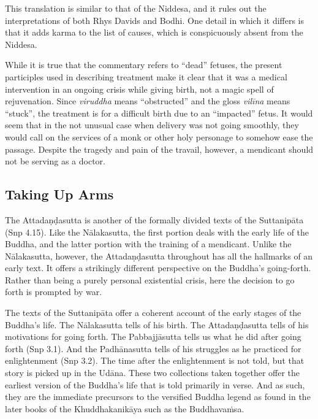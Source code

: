 \documentclass[12pt,openany]{book}%
\begin{document}
This translation is similar to that of the Niddesa, and it rules out the interpretations of both Rhys Davids and Bodhi. One detail in which it differs is that it adds karma to the list of causes, which is conspicuously absent from the Niddesa.

While it is true that the commentary refers to “dead” fetuses, the present participles used in describing treatment make it clear that it was a medical intervention in an ongoing crisis while giving birth, not a magic spell of rejuvenation. Since \textit{viruddha} means “obstructed” and the gloss \textit{\textsanskrit{vilīna}} means “stuck”, the treatment is for a difficult birth due to an “impacted” fetus. It would seem that in the not unusual case when delivery was not going smoothly, they would call on the services of a monk or other holy personage to somehow ease the passage. Despite the tragedy and pain of the travail, however, a mendicant should not be serving as a doctor.

\subsection*{Taking Up Arms}

The \textsanskrit{Attadaṇḍasutta} is another of the formally divided texts of the \textsanskrit{Suttanipāta} (Snp 4.15). Like the \textsanskrit{Nālakasutta}, the first portion deals with the early life of the Buddha, and the latter portion with the training of a mendicant. Unlike the \textsanskrit{Nālakasutta}, however, the \textsanskrit{Attadaṇḍasutta} throughout has all the hallmarks of an early text. It offers a strikingly different perspective on the Buddha’s going-forth. Rather than being a purely personal existential crisis, here the decision to go forth is prompted by war.

The texts of the \textsanskrit{Suttanipāta} offer a coherent account of the early stages of the Buddha’s life. The \textsanskrit{Nālakasutta} tells of his birth. The \textsanskrit{Attadaṇḍasutta} tells of his motivations for going forth. The \textsanskrit{Pabbajjāsutta} tells us what he did after going forth (Snp 3.1). And the \textsanskrit{Padhānasutta} tells of his struggles as he practiced for enlightenment (Snp 3.2). The time after the enlightenment is not told, but that story is picked up in the \textsanskrit{Udāna}. These two collections taken together offer the earliest version of the Buddha’s life that is told primarily in verse. And as such, they are the immediate precursors to the versified Buddha legend as found in the later books of the \textsanskrit{Khuddhakanikāya} such as the \textsanskrit{Buddhavaṁsa}.
\end{document}
